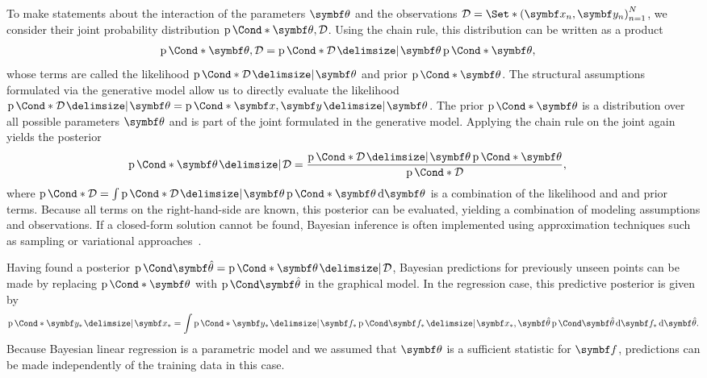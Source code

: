 To make statements about the interaction of the parameters $\mat{\theta}$ and the observations $\Dc = \Set*{(\mat{x}_n, \mat{y}_n)}_{n=1}^N$, we consider their joint probability distribution $\Prob*{\mat{\theta}, \Dc}$.
Using the chain rule, this distribution can be written as a product
\begin{align}
    \begin{split}
        \Prob*{\mat{\theta}, \Dc}
        &= \Prob*{\Dc \given \mat{\theta}}\Prob*{\mat{\theta}},
    \end{split}
\end{align}
whose terms are called the likelihood $\Prob*{\Dc \given \mat{\theta}}$ and prior $\Prob*{\mat{\theta}}$.
The structural assumptions formulated via the generative model allow us to directly evaluate the likelihood $\Prob*{\Dc \given \mat{\theta}} = \Prob*{\mat{x}, \mat{y} \given \mat{\theta}}$.
The prior $\Prob*{\mat{\theta}}$ is a distribution over all possible parameters $\mat{\theta}$ and is part of the joint formulated in the generative model.
Applying the chain rule on the joint again yields the posterior
\begin{align}
\begin{split}
    \Prob*{\mat{\theta} \given \Dc}
    &= \frac{\Prob*{\Dc \given \mat{\theta}}\Prob*{\mat{\theta}}}{\Prob*{\Dc}},
\end{split}
\end{align}
where $\Prob*{\Dc} = \int \Prob*{\Dc \given \mat{\theta}} \Prob*{\mat{\theta}} \diff \mat{\theta}$ is a combination of the likelihood and and prior terms.
Because all terms on the right-hand-side are known, this posterior can be evaluated, yielding a combination of modeling assumptions and observations.
If a closed-form solution cannot be found, Bayesian inference is often implemented using approximation techniques such as sampling or variational approaches~\parencite{bishop_christoph_pattern_2007}.

Having found a posterior $\Prob{\mat{\hat{\theta}}} = \Prob*{\mat{\theta} \given \Dc}$, Bayesian predictions for previously unseen points can be made by replacing $\Prob*{\mat{\theta}}$ with $\Prob{\mat{\hat{\theta}}}$ in the graphical model.
In the regression case, this predictive posterior is given by
\begin{align}
\begin{split}
    \Prob*{\mat{y}_\ast \given \mat{x}_\ast} = \int \Prob*{\mat{y}_\ast \given \mat{f}_\ast} \Prob{\mat{f}_\ast \given \mat{x}_\ast, \mat{\hat{\theta}}} \Prob{\mat{\hat{\theta}}} \diff \mat{f}_\ast \diff \mat{\hat{\theta}}.
\end{split}
\end{align}
Because Bayesian linear regression is a parametric model and we assumed that $\mat{\theta}$ is a sufficient statistic for $\mat{f}$, predictions can be made independently of the training data in this case.

